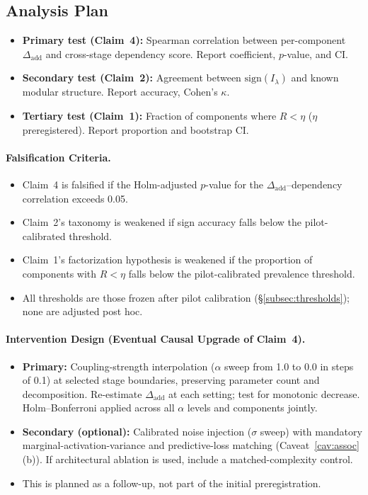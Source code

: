 \documentclass[11pt,a4paper]{article}
\theoremstyle{definition}
\theoremstyle{remark}
\newcommand{\Dadd}{\Delta_{\mathrm{add}}}
\newcommand{\Ilambda}{I_{\lambda}}
\begin{document}
\subsection{Analysis Plan}\label{subsec:analysis}

\begin{itemize}
  \item \textbf{Primary test (Claim~4):} Spearman correlation between
    per-component $\Dadd$ and cross-stage dependency score.  Report
    coefficient, $p$-value, and CI.
  \item \textbf{Secondary test (Claim~2):} Agreement between
    $\mathrm{sign}(\Ilambda)$ and known modular structure.  Report accuracy,
    Cohen's $\kappa$.
  \item \textbf{Tertiary test (Claim~1):} Fraction of components where
    $R < \eta$ ($\eta$ preregistered).  Report proportion and bootstrap CI.
\end{itemize}

\paragraph{Falsification Criteria.}
\begin{itemize}
  \item Claim~4 is falsified if the Holm-adjusted $p$-value for the
    $\Dadd$--dependency correlation exceeds 0.05.
  \item Claim~2's taxonomy is weakened if sign accuracy falls below the
    pilot-calibrated threshold.
  \item Claim~1's factorization hypothesis is weakened if the proportion of
    components with $R < \eta$ falls below the pilot-calibrated prevalence
    threshold.
  \item All thresholds are those frozen after pilot calibration
    (\S\ref{subsec:thresholds}); none are adjusted post hoc.
\end{itemize}

\paragraph{Intervention Design (Eventual Causal Upgrade of Claim~4).}
\begin{itemize}
  \item \textbf{Primary:} Coupling-strength interpolation ($\alpha$ sweep from
    1.0 to 0.0 in steps of 0.1) at selected stage boundaries, preserving
    parameter count and decomposition.  Re-estimate $\Dadd$ at each setting;
    test for monotonic decrease.  Holm--Bonferroni applied across all $\alpha$
    levels and components jointly.
  \item \textbf{Secondary (optional):} Calibrated noise injection ($\sigma$
    sweep) with mandatory marginal-activation-variance and predictive-loss
    matching (Caveat~\ref{cav:assoc}(b)).  If architectural ablation is used,
    include a matched-complexity control.
  \item This is planned as a follow-up, not part of the initial
    preregistration.
\end{itemize}
\end{document}
